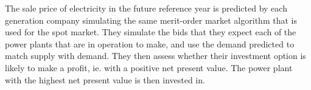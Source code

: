 The sale price of electricity in the future reference year is predicted by each generation company simulating the same merit-order market algorithm that is used for the spot market. They simulate the bids that they expect each of the power plants that are in operation to make, and use the demand predicted to match supply with demand. They then assess whether their investment option is likely to make a profit, ie. with a positive net present value. The power plant with the highest net present value is then invested in. 




%
